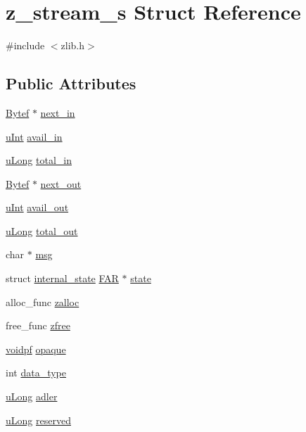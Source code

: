 \hypertarget{structz__stream__s}{}\section{z\+\_\+stream\+\_\+s Struct Reference}
\label{structz__stream__s}


{\ttfamily \#include $<$zlib.\+h$>$}

\subsection*{Public Attributes}
\begin{DoxyCompactItemize}
\item 
\hyperlink{zconf_8h_aeb722a888064be47e12d05f692e0f407}{Bytef} $\ast$ \hyperlink{structz__stream__s_a21d2c026f0f2fcd67f33011231f8ed00}{next\+\_\+in}
\item 
\hyperlink{zconf_8h_a87d141052bcd5ec8a80812a565c70369}{u\+Int} \hyperlink{structz__stream__s_a0cf177f50dbb49692f27480cbcfde794}{avail\+\_\+in}
\item 
\hyperlink{zconf_8h_acd2a5701a3aecf6700d2c66c606ecb40}{u\+Long} \hyperlink{structz__stream__s_aa8f408b9632737dc21519fa1ed34b08d}{total\+\_\+in}
\item 
\hyperlink{zconf_8h_aeb722a888064be47e12d05f692e0f407}{Bytef} $\ast$ \hyperlink{structz__stream__s_aed4a02cfe93e975314fed50b04427bf3}{next\+\_\+out}
\item 
\hyperlink{zconf_8h_a87d141052bcd5ec8a80812a565c70369}{u\+Int} \hyperlink{structz__stream__s_a45ad2364307af9d944fd39d4eca3ca3c}{avail\+\_\+out}
\item 
\hyperlink{zconf_8h_acd2a5701a3aecf6700d2c66c606ecb40}{u\+Long} \hyperlink{structz__stream__s_abae26f1f236cf920250b9d37fdf009c1}{total\+\_\+out}
\item 
char $\ast$ \hyperlink{structz__stream__s_a9b2f745fc780e3b33e2935f8c650a326}{msg}
\item 
struct \hyperlink{structinternal__state}{internal\+\_\+state} \hyperlink{zconf_8h_aef060b3456fdcc093a7210a762d5f2ed}{F\+AR} $\ast$ \hyperlink{structz__stream__s_ac4a114217a1868dc6fbe7d1f5bda126b}{state}
\item 
alloc\+\_\+func \hyperlink{structz__stream__s_a23a2299c384f808e76e9908f21216b0f}{zalloc}
\item 
free\+\_\+func \hyperlink{structz__stream__s_a89eb750ade7f4f0b56bfdadf13344982}{zfree}
\item 
\hyperlink{zconf_8h_a04c731495379021454c8e61439dc88ec}{voidpf} \hyperlink{structz__stream__s_ab72467f908d2ce65d5b42ee6556ef8bb}{opaque}
\item 
int \hyperlink{structz__stream__s_a9d8f63877d7639a8bca60f9fc3704fc4}{data\+\_\+type}
\item 
\hyperlink{zconf_8h_acd2a5701a3aecf6700d2c66c606ecb40}{u\+Long} \hyperlink{structz__stream__s_ade2217fe31e671be1257731883201223}{adler}
\item 
\hyperlink{zconf_8h_acd2a5701a3aecf6700d2c66c606ecb40}{u\+Long} \hyperlink{structz__stream__s_add73791dd19b49c9c68f3f3d328c37db}{reserved}
\end{DoxyCompactItemize}


